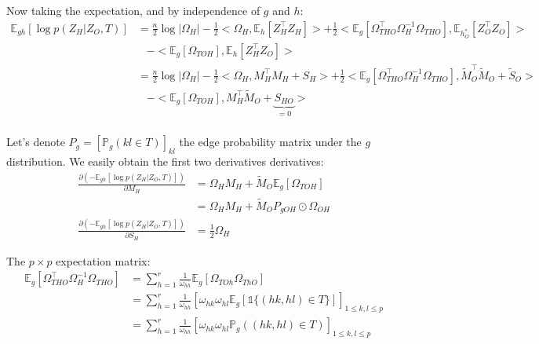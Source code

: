 \documentclass[11pt,a4paper]{article}
\newcommand{\Esp}{\mathds{E}}
\begin{document}
Now taking the expectation, and by independence of $g$ and $h$:
\begin{align*}
\Esp_{gh}[\log p(Z_H | Z_O,T) ] &=\frac{n}{2} \log |\Omega_H| -\frac{1}{2} <\Omega_H,\Esp_h[Z_H^\intercal Z_H]> +\frac{1}{2} <\Esp_g[\Omega_{THO}^\intercal \Omega_H^{-1}\Omega_{THO}],\Esp_{h_O^*}[Z_O^\intercal Z_O]> \\
&\;\;\; -<\Esp_g[\Omega_{TOH}],\Esp_h[Z_H^\intercal Z_O]>\\
&=\frac{n}{2} \log |\Omega_H|-\frac{1}{2} <\Omega_H,M_H^\intercal M_H + S_H> +\frac{1}{2} <\Esp_g[\Omega_{THO}^\intercal \Omega_H^{-1}\Omega_{THO}],\widetilde{M}_O^\intercal \widetilde{M}_O + \widetilde{S}_O>\\
&\;\;\; -<\Esp_g[\Omega_{TOH}],M_H^\intercal \widetilde{M}_O +  \underbrace{S_{HO}}_{=0}>
\end{align*}\\

Let's denote $P_g = [\mathds{P}_g(kl \in T)]_{kl}$ the edge probability matrix under the $g$ distribution. We easily obtain the first two derivatives derivatives:
\begin{align*}
\frac{\partial (-\Esp_{gh}[\log p(Z_H | Z_O,T) ])}{\partial M_H}&=  \Omega_H M_H + \widetilde{M}_O\Esp_g[\Omega_{TOH}]\\
&=\Omega_H M_H + \widetilde{M}_O P_{gOH} \odot \Omega_{OH}\\
\frac{\partial (-\Esp_{gh}[\log p(Z_H | Z_O,T) ]) }{\partial S_H}&= \frac{1}{2} \Omega_H
\end{align*}


The $p \times p$ expectation matrix:
\begin{align*}
\Esp_g[\Omega_{THO}^\intercal \Omega_H^{-1}\Omega_{THO}] &= \sum_{h=1}^r \frac{1}{\omega_{hh}} \Esp_g[\Omega_{TOh} \Omega_{ThO}]\\
&= \sum_{h=1}^r \frac{1}{\omega_{hh}} \left[ \omega_{hk}\omega_{hl}\Esp_g[\mathds{1}\{(hk,hl)\in T\}]\right]_{1\leq k,l\leq p}\\
&=\sum_{h=1}^r \frac{1}{\omega_{hh}} \left[ \omega_{hk}\omega_{hl}\mathds{P}_g((hk,hl)\in T)\right]_{1\leq k,l\leq p}
\end{align*}\\
\end{document}
